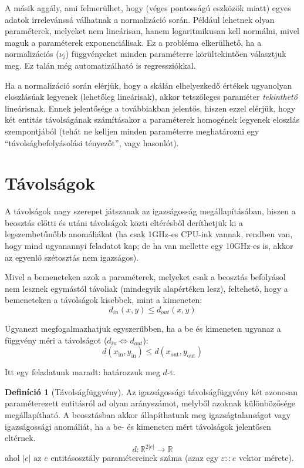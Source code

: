 \documentclass[twocolumn]{article}
\theoremstyle{definition}
\newtheorem{definition}{Definíció}[section]
\newcommand{\subin}[1]{ {#1}_{\text{in}} }
\newcommand{\subout}[1]{ {#1}_{\text{out}} }
\begin{document}
    A másik aggály, ami felmerülhet, hogy (véges pontosságú eszközök miatt) egyes adatok irrelevánssá válhatnak a normalizáció során. Például lehetnek olyan paraméterek, melyeket nem lineárisan, hanem logaritmikusan kell normálni, mivel maguk a paraméterek exponenciálisak. Ez a probléma elkerülhető, ha a normalizációs ($\nu_i$) függvényeket minden paraméterre körültekintően választjuk meg. Ez talán még automatizálható is regressziókkal.
    
    Ha a normalizáció során elérjük, hogy a skálán elhelyezkedő értékek ugyanolyan eloszlásúak legyenek (lehetőleg lineárisak), akkor tetszőleges paraméter {\it tekinthető} lineárisnak. Ennek jelentősége a továbbiakban jelentős, hiszen ezzel elérjük, hogy két entitás távolságának számításakor a paraméterek homogének legyenek eloszlás szempontjából (tehát ne kelljen minden paraméterre meghatározni egy \enquote{távolságbefolyásolási tényezőt}, vagy hasonlót).
    
\section{Távolságok}    
    
    A távolságok nagy szerepet játszanak az igazságosság megállapításában, hiszen a beosztás előtti és utáni távolságok közti eltérésből deríthetjük ki a legszembetűnőbb anomáliákat (ha csak 1GHz-es CPU-ink vannak, rendben van, hogy mind ugyanannyi feladatot kap; de ha van mellette egy 10GHz-es is, akkor az egyenlő szétosztás nem igazságos).
    
    Mivel a bemeneteken azok a paraméterek, melyeket csak a beosztás befolyásol nem lesznek egymástól távoliak (mindegyik alapértéken lesz), feltehető, hogy a bemeneteken a távolságok kisebbek, mint a kimeneten:
    $$ d_{in}(x, y) \leq d_{out}(x, y) $$
    
    Ugyanezt megfogalmazhatjuk egyszerűbben, ha a be és kimeneten ugyanaz a függvény méri a távolságot ($d_{in} \Leftrightarrow d_{out}$):
    \begin{equation}
        d(\subin{x}, \subin{y}) \leq d(\subout{x}, \subout{y})
    \end{equation}
    
    Itt egy feladatunk maradt: határozzuk meg $d$-t.
    
    \begin{definition}[Távolságfüggvény]
        Az igazságossági távolságfüggvény két azonosan paraméterezett entitásról ad olyan arányszámot, melyből azoknak különbözősége megállapítható. A beosztásban akkor állapíthatunk meg igazságtalanságot vagy igazságossági anomáliát, ha a be- és kimeneten mért távolságok jelentősen eltérnek.
        \begin{equation}
            d: \mathbb{R}^{2|e|} \to \mathbb{R}
        \end{equation}
        ahol $|e|$ az $e$ entitásosztály paramétereinek száma (azaz egy $\varepsilon :: e$ vektor mérete).
    \end{definition}
    
\end{document}
